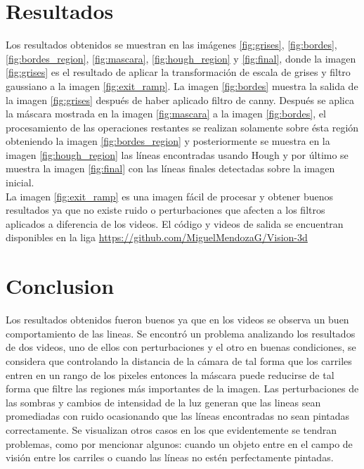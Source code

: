 \documentclass[10pt]{IEEEtran}
\begin{document}
\section{Resultados}
Los resultados obtenidos se muestran en las imágenes \ref{fig:grises}, \ref{fig:bordes}, \ref{fig:bordes_region}, \ref{fig:mascara}, \ref{fig:hough_region} y \ref{fig:final}, donde la imagen \ref{fig:grises} es el resultado de aplicar la transformación de escala de grises y filtro gaussiano a la imagen \ref{fig:exit_ramp}. La imagen \ref{fig:bordes} muestra la salida de la imagen \ref{fig:grises} después de haber aplicado filtro de canny. Después se aplica la máscara mostrada en la imagen \ref{fig:mascara} a la imagen \ref{fig:bordes}, el procesamiento de las operaciones restantes se realizan solamente sobre ésta región obteniendo la imagen \ref{fig:bordes_region} y posteriormente se muestra en la imagen \ref{fig:hough_region} las líneas encontradas usando Hough y por último se muestra la imagen \ref{fig:final} con las líneas finales detectadas sobre la imagen inicial.\\
La imagen \ref{fig:exit_ramp} es una imagen fácil de procesar y obtener buenos resultados ya que no existe ruido o perturbaciones que afecten a los filtros aplicados a diferencia de los videos. El código y videos de salida se encuentran disponibles en la liga \url{https://github.com/MiguelMendozaG/Vision-3d}


\section{Conclusion}
Los resultados obtenidos fueron buenos ya que en los videos se observa un buen comportamiento de las lineas. Se encontró un problema analizando los resultados de dos videos, uno de ellos con perturbaciones y el otro en buenas condiciones, se considera que controlando la distancia de la cámara de tal forma que los carriles entren en un rango de los pixeles entonces la máscara puede reducirse de tal forma que filtre las regiones más importantes de la imagen. Las perturbaciones de las sombras y cambios de intensidad de la luz generan que las lineas sean promediadas con ruido ocasionando que las líneas encontradas no sean pintadas correctamente. Se visualizan otros casos en los que evidentemente se tendran problemas, como por mencionar algunos: cuando un objeto entre en el campo de visión entre los carriles o cuando las líneas no estén perfectamente pintadas.
\end{document}
